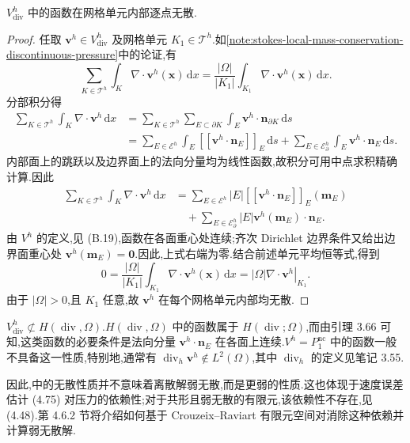 \begin{lemma}[离散散度为零空间中函数的无散性质]\label{lem:stokes-nonconforming-cellwise-divergence-free}
$V_{\mathrm{div}}^h$ 中的函数在网格单元内部逐点无散.
\end{lemma}
\begin{proof}
任取 $\bm{v}^h\in V_{\mathrm{div}}^h$ 及网格单元 $K_1\in\mathcal{T}^h$.如\cref{note:stokes-local-mass-conservation-discontinuous-pressure}中的论证,有
\begin{equation}\label{eq:stokes-nonconforming-global-divergence-relation}
  \sum_{K\in\mathcal{T}^h}\int_K\nabla\cdot\bm{v}^h(\bm{x})\,\mathrm{d}x
  =\frac{|\Omega|}{|K_1|}\int_{K_1}\nabla\cdot\bm{v}^h(\bm{x})\,\mathrm{d}x.
\end{equation}
分部积分得
\[
\begin{aligned}
  \sum_{K\in\mathcal{T}^h}\int_K\nabla\cdot\bm{v}^h\,\mathrm{d}x
  &=\sum_{K\in\mathcal{T}^h}\sum_{E\subset\partial K}
       \int_E\bm{v}^h\cdot\bm{n}_{\partial K}\,\mathrm{d}s\\
  &=\sum_{E\in\mathcal{E}^h}\int_E
       \left[\!\left[\bm{v}^h\cdot\bm{n}_E\right]\!\right]_E\,\mathrm{d}s
    +\sum_{E\in\mathcal{E}_{\partial}^h}\int_E
       \bm{v}^h\cdot\bm{n}_E\,\mathrm{d}s.
\end{aligned}
\]
内部面上的跳跃以及边界面上的法向分量均为线性函数,故积分可用中点求积精确计算.因此
\[
\begin{aligned}
  \sum_{K\in\mathcal{T}^h}\int_K\nabla\cdot\bm{v}^h\,\mathrm{d}x
  &=\sum_{E\in\mathcal{E}^h}|E|
       \left[\!\left[\bm{v}^h\cdot\bm{n}_E\right]\!\right]_E(\bm{m}_E)\\
  &\quad+\sum_{E\in\mathcal{E}_{\partial}^h}|E|
       \bm{v}^h(\bm{m}_E)\cdot\bm{n}_E.
\end{aligned}
\]
由 $V^h$ 的定义,见 (B.19),函数在各面重心处连续;齐次 Dirichlet 边界条件又给出边界面重心处 $\bm{v}^h(\bm{m}_E)=\bm{0}$.因此,上式右端为零.结合前述单元平均恒等式,得到
\[
  0=\frac{|\Omega|}{|K_1|}\int_{K_1}\nabla\cdot\bm{v}^h(\bm{x})\,\mathrm{d}x
   =|\Omega|\left.\nabla\cdot\bm{v}^h\right|_{K_1}.
\]
由于 $|\Omega|>0$,且 $K_1$ 任意,故 $\bm{v}^h$ 在每个网格单元内部均无散.
\end{proof}

\begin{note}\label{note:stokes-nonconforming-not-weak-divergence-free}
$V_{\mathrm{div}}^h\not\subset H(\operatorname{div},\Omega)$.$H(\operatorname{div},\Omega)$ 中的函数属于 $H(\operatorname{div};\Omega)$,而由引理 3.66 可知,这类函数的必要条件是法向分量 $\bm{v}^h\cdot\bm{n}_E$ 在各面上连续.$V^h=P_1^{\mathrm{nc}}$ 中的函数一般不具备这一性质,特别地,通常有 $\operatorname{div}_h\bm{v}^h\notin L^2(\Omega)$,其中 $\operatorname{div}_h$ 的定义见笔记 3.55.

因此,中的无散性质并不意味着离散解弱无散,而是更弱的性质.这也体现于速度误差估计 (4.75) 对压力的依赖性;对于共形且弱无散的有限元,该依赖性不存在,见 (4.48).第 4.6.2 节将介绍如何基于 Crouzeix--Raviart 有限元空间对消除这种依赖并计算弱无散解.
\end{note}

